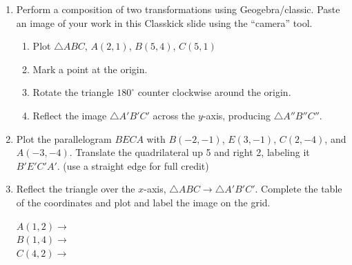 \begin{enumerate}
\item Perform a composition of two transformations using Geogebra/classic. Paste an image of your work in this Classkick slide using the ``camera'' tool.
  \begin{enumerate}
    \item Plot $\triangle ABC$, $A(2,1)$, $B(5,4)$, $C(5,1)$
    \item Mark a point at the origin.
    \item Rotate the triangle $180^\circ$ counter clockwise around the origin.
    \item Reflect the image $\triangle A'B'C'$ across the $y$-axis, producing $\triangle A''B''C''$.
  \end{enumerate}

\newpage
\item Plot the parallelogram $BECA$ with $B(-2,-1)$, $E(3,-1)$, $C(2,-4)$, and $A(-3,-4)$. Translate the quadrilateral up 5 and right 2, labeling it $B'E'C'A'$. (use a straight edge for full credit)
    \begin{center}
  \end{center}
  
\item Reflect the triangle over the $x$-axis, $\triangle ABC \rightarrow \triangle A'B'C'$. Complete the table of the coordinates and plot and label the image on the grid. \vspace{0.5cm}
  \begin{multicols}{2}
    $A(1,2) \rightarrow$ \\[0.7cm]
    $B(1,4) \rightarrow$ \\[0.7cm]
    $C(4,2) \rightarrow$ \\[0.7cm]
    \end{multicols}


\end{enumerate}
